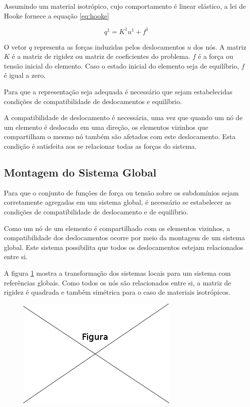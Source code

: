 \documentclass[
    12pt,               %
    openright,          %
    oneside,
    a4paper,            %
    english,            %
    french,             %
    spanish,            %
    brazil              %
    ]{abntex2}
\begin{document}
Assumindo um material isotrópico, cujo comportamento é linear elástico, a lei de Hooke fornece a equação \ref{eq:hooke}

 \begin{equation}
    \label{eq:hooke}
    \textbf{$q^1 = K^1 u^1 + f^1$}
 \end{equation}
 
 O vetor $q$ representa as forças induzidas pelos deslocamentos $u$ dos nós. A matriz $K$ é a matriz de rigidez ou matriz de coeficientes do problema. $f$ é a força ou tensão inicial do elemento. Caso o estado inicial do elemento seja de equilíbrio, $f$ é igual a zero.
 
 Para que a representação seja adequada é necessário que sejam estabelecidas condições de compatibilidade de deslocamentos e equilíbrio.
 
 A compatibilidade de deslocamento é necessária, uma vez que quando um nó de um elemento é deslocado em uma direção, os elementos vizinhos que compartilham o mesmo nó também são afetados com este deslocamento. Esta condição é satisfeita aos se relacionar todas as forças do sistema.
 
 \subsection{Montagem do Sistema Global}
 
 Para que o conjunto de funções de força ou tensão sobre os subdomínios sejam corretamente agregadas em um sistema global, é necessário se estabelecer as condições de compatibilidade de deslocamento e de equilíbrio.
 
 Como um nó de um elemento é compartilhado com os elementos vizinhos, a compatibilidade dos deslocamentos ocorre por meio da montagem de um sistema global. Este sistema possibilita que todos os deslocamentos estejam relacionados entre si.
 
  A figura \ref{fig:loc2glob} mostra a transformação dos sistemas locais para um sistema com referências globais. Como todos os nós são relacionados entre si, a matriz de rigidez é quadrada e também simétrica para o caso de materiais isotrópicos.
  
  \begin{figure}[!htb]
  \centering
  \includegraphics[scale=0.5]{figuras/temp.png}
  \caption{}
  \label{fig:loc2glob}
  \end{figure}
  
\end{document}
